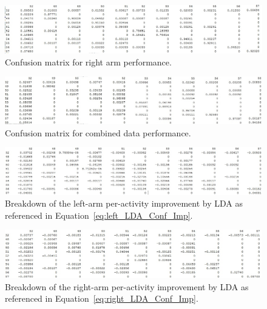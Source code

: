 \documentclass{sig-alternate}
\begin{document}
\begin{figure}[bp]
\includegraphics[width=1.0\linewidth]{visual_results/nConfkNN_right.jpg}
\centering
\caption{Confusion matrix for right arm performance.}
\label{fig:conf_right}
\end{figure}

\begin{figure}[bp]
\includegraphics[width=1.0\linewidth]{visual_results/nConfkNN_both.jpg}
\centering
\caption{Confusion matrix for combined data performance.}
\label{fig:conf_both}
\vspace{150pt}
\end{figure}
	

\begin{figure}
\begin{center}
  \includegraphics[width=1.0\linewidth]{visual_results/nConfkNN_left_imp_LDA.jpg}
\end{center}
  \caption{Breakdown of the left-arm per-activity improvement by LDA as referenced in Equation~\ref{eq:left_LDA_Conf_Imp}.}
  \label{fig:conf_left_imp_LDA}
\end{figure}

\begin{figure}
\begin{center}
  \includegraphics[width=1.0\linewidth]{visual_results/nConfkNN_right_imp_LDA.jpg}
\end{center}
  \caption{Breakdown of the right-arm per-activity improvement by LDA as referenced in Equation~\ref{eq:right_LDA_Conf_Imp}.}
  \label{fig:conf_right_imp_LDA}
\end{figure}


%


\end{document}
